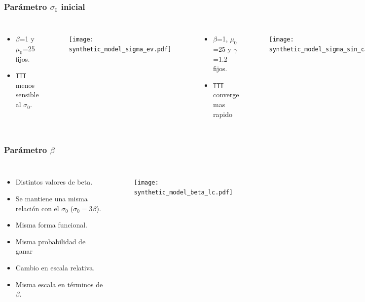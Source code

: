 \documentclass{beamer}
\begin{document}
\begin{frame}
\frametitle{Par\'ametro $\sigma_0$ inicial}

\begin{columns}
   \begin{itemize}
    \item $\beta$=1 y $\mu_0$=25 fijos.
\item \texttt{TTT} menos sensible al $\sigma_0$.
  \end{itemize}
 
  \begin{figure}[H]
	\centering
	\texttt{[image: synthetic\_model\_sigma\_ev.pdf]}
\end{figure}
 
   \begin{itemize}
\item $\beta$=1, $\mu_0$=25 y $\gamma$=1.2 fijos.
  \item \texttt{TTT} converge mas rapido
  \end{itemize}
 
  \begin{figure}[H]
	\centering
	\texttt{[image: synthetic\_model\_sigma\_sin\_cambios.pdf]}
\end{figure}
\end{columns}

\end{frame}

\begin{frame}
\frametitle{Par\'ametro $\beta$}

\begin{columns}
 
  \begin{itemize}
  \item Distintos valores de beta. 
  \item Se mantiene una misma relaci\'on con el $\sigma_0$ ($\sigma_0=3\beta$).
  \item Misma forma funcional.
  \item Misma probabilidad de ganar
  \item Cambio en escala relativa.
  \item Misma escala en t\'erminos de $\beta$.
  \end{itemize}
 
  \begin{figure}[H]
	\centering
	\texttt{[image: synthetic\_model\_beta\_lc.pdf]}
\end{figure}
\end{columns}

\end{frame}
\end{document}
